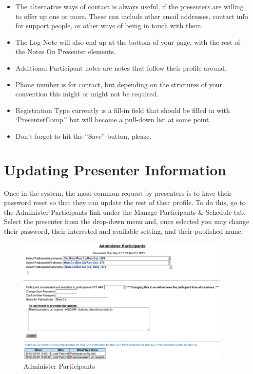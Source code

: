 \documentclass[tablesignature]{scrartcl}
\begin{document}
\begin{itemize}
\item The alternative ways of contact is always useful, if the
     presenters are willing to offer up one or more.  These can
     include other email addresses, contact info for support people,
     or other ways of being in touch with them.
\item The Log Note will also end up at the bottom of your page, with
     the rest of the Notes On Presenter elements.
\item Additional Participant notes are notes that follow their profile
     around.
\item Phone number is for contact, but depending on the strictures of
     your convention this might or might not be required.
\item Registration Type currently is a fill-in field that should be
     filled in with `PresenterComp'' but will become a pull-down list
     at some point.
\item Don't forget to hit the ``Save'' button, please.
\end{itemize}
\section{Updating Presenter Information}
\label{sec-3}


  Once in the system, the most common request by presenters is to have
  their password reset so that they can update the rest of their
  profile.  To do this, go to the Administer Participants link under
  the Manage Participants \& Schedule tab.  Select the presenter from
  the drop-down menu and, once selected you may change their password,
  their interested and available setting, and their published name.

\begin{figure}[H]
\centering
\includegraphics[width=0.95\textwidth]{./Images/Administer_Participants.png}
\caption{\label{fig:Zambia_Presenter_Flow_Administer_Participants}Administer Participants}
\end{figure}
\end{document}
